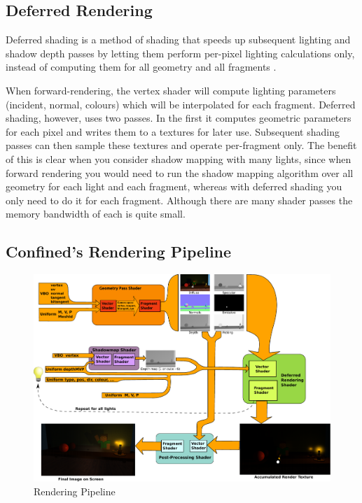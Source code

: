 \documentclass{book}
\begin{document}
    \subsection{Deferred Rendering} \label{deferred-rendering}
      Deferred shading is a method of shading that speeds up subsequent lighting and shadow depth passes by letting them perform per-pixel lighting calculations only, instead of computing them for all geometry and all fragments \cite{ferkoreal}.

      When forward-rendering, the vertex shader will compute lighting parameters (incident, normal, colours) which will be interpolated for each fragment. Deferred shading, however, uses two passes. In the first it computes geometric parameters for each pixel and writes them to a textures for later use. Subsequent shading passes can then sample these textures and operate per-fragment only. The benefit of this is clear when you consider shadow mapping with many lights, since when forward rendering you would need to run the shadow mapping algorithm over all geometry for each light and each fragment, whereas with deferred shading you only need to do it for each fragment. Although there are many shader passes the memory bandwidth of each is quite small.


    \subsection{Confined's Rendering Pipeline}
      \begin{figure}[h!]
        \centering
        \includegraphics[width=1.0\textwidth]{rendering_pipeline}
        \caption{Rendering Pipeline}
        \label{pipeline-img}
      \end{figure}
\end{document}
